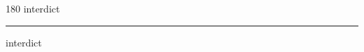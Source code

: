 
\begin{frame}
\begin{center}
\begin{turn}{180}
{\fontsize{2.5cm}{1em}\selectfont interdict}
\end{turn}
\vspace{1em}\par  
\hrule
\vspace{1em}\par  
{\fontsize{2.5cm}{1em}\selectfont interdict}
\end{center}
\end{frame}

